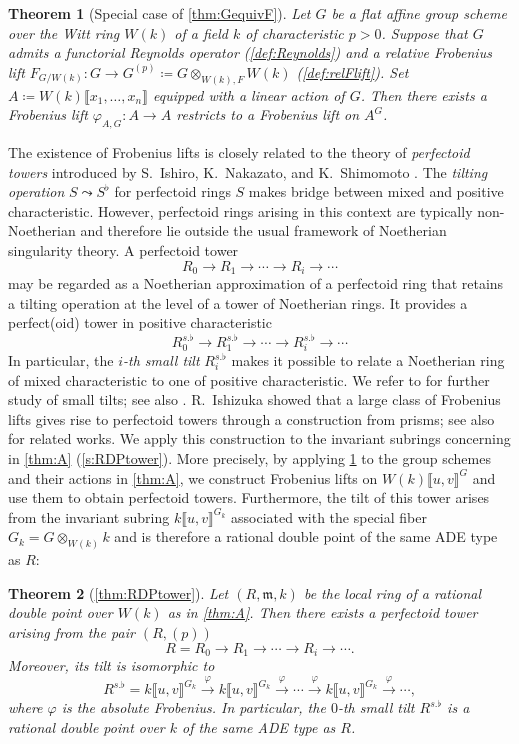 \documentclass[uplatex,11pt,a4paper]{amsart} %
\numberwithin{equation}{section}
\numberwithin{figure}{section}
\numberwithin{table}{section}
\theoremstyle{plain}
\newtheorem{theoremA}{Theorem}\renewcommand{\thetheoremA}{\Alph{theoremA}}
\theoremstyle{definition}
\newcommand{\xr}{\xrightarrow}
\newcommand{\m}{\mathfrak{m}}
\begin{document}
\begin{theoremA}[{Special case of \cref{thm:GequivF}}]
\label{thm:B}
Let $G$ be a flat affine group scheme over the Witt ring $W(k)$ of a field $k$ of characteristic $p>0$.
Suppose that $G$ admits a functorial Reynolds operator \textup{(\cref{def:Reynolds})} and a relative Frobenius lift $F_{G/W(k)}\colon G\to G^{(p)}\coloneqq G\otimes_{W(k),F}W(k)$ \textup{(\cref{def:relFlift})}. Set $A\coloneqq W(k)\llbracket x_1,\ldots,x_n\rrbracket$ equipped with a linear action of $G$.
Then there exists a Frobenius lift $\varphi_{A,G}\colon A\to A$ restricts to a Frobenius lift on $A^G$.
\end{theoremA}

The existence of Frobenius lifts is closely related to the theory of \emph{perfectoid towers} introduced by S.~Ishiro, K.~Nakazato, and K.~Shimomoto \cite{INS25}. The \emph{tilting operation} $S\leadsto S^\flat$ for perfectoid rings $S$ makes bridge between mixed and positive characteristic. However, perfectoid rings arising in this context are typically non-Noetherian and therefore lie outside the usual framework of Noetherian singularity theory. A perfectoid tower
\[
R_0\to R_1\to \cdots \to R_i\to \cdots
\]
may be regarded as a Noetherian approximation of a perfectoid ring that retains a tilting operation at the level of a tower of Noetherian rings. It provides a perfect(oid) tower in positive characteristic
\[
R_0^{s.\flat}\to R_1^{s.\flat}\to \cdots \to R_i^{s.\flat}\to \cdots
\]
In particular, the \emph{$i$-th small tilt} $R_i^{s.\flat}$ makes it possible to relate a Noetherian ring of mixed
characteristic to one of positive characteristic. We refer to \cite{Ha26a} for further study of small tilts; see also \cite{HIS26, Ha26b,Ha26c}.
R.~Ishizuka \cite{Ish26} showed that a large class of Frobenius lifts gives rise to perfectoid towers through a construction from prisms; see also \cite{IS25,Ya26} for related works. We apply this construction to the invariant subrings concerning in \cref{thm:A} (\cref{s:RDPtower}). More precisely, by applying \cref{thm:B} to the group schemes and their actions in \cref{thm:A}, we construct Frobenius lifts on $W(k)\llbracket u,v\rrbracket^G$ and use them to obtain perfectoid towers.
Furthermore, the tilt of this tower arises from the invariant subring $k\llbracket u,v\rrbracket^{G_k}$ associated with the special fiber $G_k=G\otimes_{W(k)}k$ and is therefore a rational double point of the same ADE type as $R$:

\begin{theoremA}[\cref{thm:RDPtower}]
\label{thm:C}
Let $(R,\m,k)$ be the local ring of a rational double point over $W(k)$ as in \textup{\cref{thm:A}}. Then there exists a perfectoid tower arising from the pair $(R,(p))$
\[
R=R_0\to R_1\to \cdots \to R_i\to \cdots.
\]
Moreover, its tilt is isomorphic to
\[
R^{s.\flat}=k\llbracket u,v\rrbracket^{G_k} \xr{\varphi} k\llbracket u,v\rrbracket^{G_k} \xr{\varphi}\cdots \xr{\varphi} k\llbracket u,v\rrbracket^{G_k} \xr{\varphi}\cdots,
\]
where $\varphi$ is the absolute Frobenius. In particular, the $0$-th small tilt $R^{s.\flat}$ is a rational double point over $k$ of the same ADE type as $R$.
\end{theoremA}
\end{document}
